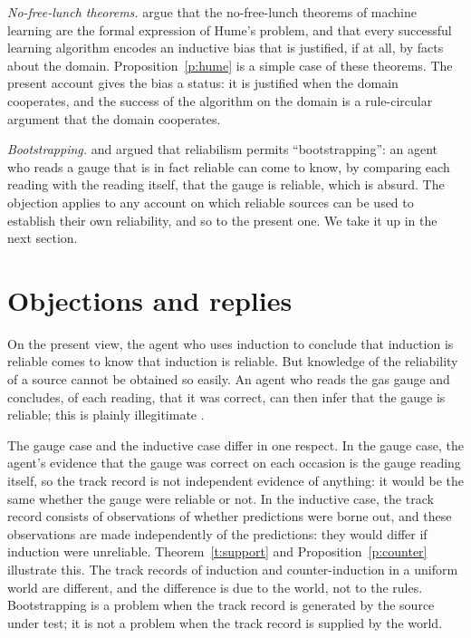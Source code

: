 \documentclass{situationist-preprint}
\begin{document}
\emph{No-free-lunch theorems.} \citet{SterkenburgGrunwald2021} argue that the no-free-lunch theorems of machine learning are the formal expression of Hume's problem, and that every successful learning algorithm encodes an inductive bias that is justified, if at all, by facts about the domain. Proposition~\ref{p:hume} is a simple case of these theorems. The present account gives the bias a status: it is justified when the domain cooperates, and the success of the algorithm on the domain is a rule-circular argument that the domain cooperates.

\emph{Bootstrapping.} \citet{Vogel2000} and \citet{Cohen2002} argued that reliabilism permits \enquote{bootstrapping}: an agent who reads a gauge that is in fact reliable can come to know, by comparing each reading with the reading itself, that the gauge is reliable, which is absurd. The objection applies to any account on which reliable sources can be used to establish their own reliability, and so to the present one. We take it up in the next section.

\section{Objections and replies}

\begin{objection}[Bootstrapping]
On the present view, the agent who uses induction to conclude that induction is reliable comes to know that induction is reliable. But knowledge of the reliability of a source cannot be obtained so easily. An agent who reads the gas gauge and concludes, of each reading, that it was correct, can then infer that the gauge is reliable; this is plainly illegitimate \citep{Vogel2000}.
\end{objection}

\begin{reply}
The gauge case and the inductive case differ in one respect. In the gauge case, the agent's evidence that the gauge was correct on each occasion is the gauge reading itself, so the track record is not independent evidence of anything: it would be the same whether the gauge were reliable or not. In the inductive case, the track record consists of observations of whether predictions were borne out, and these observations are made independently of the predictions: they would differ if induction were unreliable. Theorem~\ref{t:support} and Proposition~\ref{p:counter} illustrate this. The track records of induction and counter-induction in a uniform world are different, and the difference is due to the world, not to the rules. Bootstrapping is a problem when the track record is generated by the source under test; it is not a problem when the track record is supplied by the world.
\end{reply}
\end{document}
